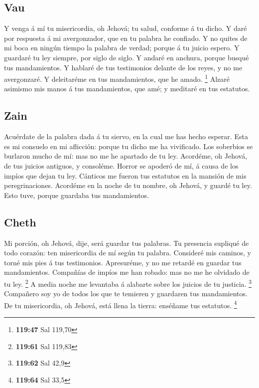 \hypertarget{vau}{%
\subsection{Vau}\label{vau}}

 Y venga á mí tu misericordia, oh Jehová; tu salud,
conforme á tu dicho.  Y daré por respuesta á mi
avergonzador, que en tu palabra he confiado.  Y no quites
de mi boca en ningún tiempo la palabra de verdad; porque á tu juicio
espero.  Y guardaré tu ley siempre, por siglo de siglo.
 Y andaré en anchura, porque busqué tus mandamientos.
 Y hablaré de tus testimonios delante de los reyes, y no me
avergonzaré.  Y deleitaréme en tus mandamientos, que he
amado. \footnote{\textbf{119:47} Sal 119,70}  Alzaré
asimismo mis manos á tus mandamientos, que amé; y meditaré en tus
estatutos.

\hypertarget{zain}{%
\subsection{Zain}\label{zain}}

 Acuérdate de la palabra dada á tu siervo, en la cual me
has hecho esperar.  Esta es mi consuelo en mi aflicción:
porque tu dicho me ha vivificado.  Los soberbios se
burlaron mucho de mí: mas no me he apartado de tu ley. 
Acordéme, oh Jehová, de tus juicios antiguos, y consoléme. 
Horror se apoderó de mí, á causa de los impíos que dejan tu ley.
 Cánticos me fueron tus estatutos en la mansión de mis
peregrinaciones.  Acordéme en la noche de tu nombre, oh
Jehová, y guardé tu ley.  Esto tuve, porque guardaba tus
mandamientos.

\hypertarget{cheth}{%
\subsection{Cheth}\label{cheth}}

 Mi porción, oh Jehová, dije, será guardar tus palabras.
 Tu presencia supliqué de todo corazón: ten misericordia de
mí según tu palabra.  Consideré mis caminos, y torné mis
pies á tus testimonios.  Apresuréme, y no me retardé en
guardar tus mandamientos.  Compañías de impíos me han
robado: mas no me he olvidado de tu ley. \footnote{\textbf{119:61} Sal
  119,83}  A media noche me levantaba á alabarte sobre los
juicios de tu justicia. \footnote{\textbf{119:62} Sal 42,9}
 Compañero soy yo de todos los que te temieren y guardaren
tus mandamientos.  De tu misericordia, oh Jehová, está
llena la tierra: enséñame tus estatutos. \footnote{\textbf{119:64} Sal
  33,5}

